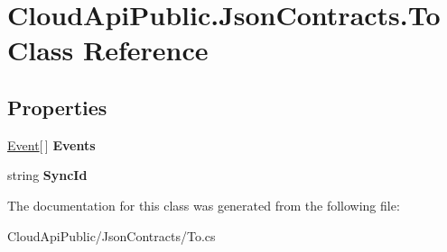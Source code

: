 \hypertarget{class_cloud_api_public_1_1_json_contracts_1_1_to}{\section{Cloud\-Api\-Public.\-Json\-Contracts.\-To Class Reference}
\label{class_cloud_api_public_1_1_json_contracts_1_1_to}
}
\subsection*{Properties}
\begin{DoxyCompactItemize}
\item 
\hypertarget{class_cloud_api_public_1_1_json_contracts_1_1_to_af2729d9981675b110e04d197bb77f254}{\hyperlink{class_cloud_api_public_1_1_json_contracts_1_1_event}{Event}\mbox{[}$\,$\mbox{]} {\bfseries Events}}\label{class_cloud_api_public_1_1_json_contracts_1_1_to_af2729d9981675b110e04d197bb77f254}

\item 
\hypertarget{class_cloud_api_public_1_1_json_contracts_1_1_to_ab43b77ef4182abf87589fdb30ba0bd6a}{string {\bfseries Sync\-Id}}\label{class_cloud_api_public_1_1_json_contracts_1_1_to_ab43b77ef4182abf87589fdb30ba0bd6a}

\end{DoxyCompactItemize}


The documentation for this class was generated from the following file\-:\begin{DoxyCompactItemize}
\item 
Cloud\-Api\-Public/\-Json\-Contracts/To.\-cs\end{DoxyCompactItemize}
